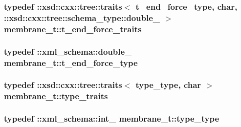 \subsubsection[{\texorpdfstring{t\+\_\+end\+\_\+force\+\_\+traits}{t_end_force_traits}}]{\setlength{\rightskip}{0pt plus 5cm}typedef \+::xsd\+::cxx\+::tree\+::traits$<$ {\bf t\+\_\+end\+\_\+force\+\_\+type}, char, \+::xsd\+::cxx\+::tree\+::schema\+\_\+type\+::double\+\_\+ $>$ {\bf membrane\+\_\+t\+::t\+\_\+end\+\_\+force\+\_\+traits}}\hypertarget{classmembrane__t_a6e52d2cbbfa0781d7ce3aec95ce1a7ab}{}\label{classmembrane__t_a6e52d2cbbfa0781d7ce3aec95ce1a7ab}
\subsubsection[{\texorpdfstring{t\+\_\+end\+\_\+force\+\_\+type}{t_end_force_type}}]{\setlength{\rightskip}{0pt plus 5cm}typedef \+::{\bf xml\+\_\+schema\+::double\+\_\+} {\bf membrane\+\_\+t\+::t\+\_\+end\+\_\+force\+\_\+type}}\hypertarget{classmembrane__t_a9c464d55e3d8162b6bb521d9dd6d761d}{}\label{classmembrane__t_a9c464d55e3d8162b6bb521d9dd6d761d}
\subsubsection[{\texorpdfstring{type\+\_\+traits}{type_traits}}]{\setlength{\rightskip}{0pt plus 5cm}typedef \+::xsd\+::cxx\+::tree\+::traits$<$ {\bf type\+\_\+type}, char $>$ {\bf membrane\+\_\+t\+::type\+\_\+traits}}\hypertarget{classmembrane__t_ac54c3884b125d2a162ce454e82f4da69}{}\label{classmembrane__t_ac54c3884b125d2a162ce454e82f4da69}
\subsubsection[{\texorpdfstring{type\+\_\+type}{type_type}}]{\setlength{\rightskip}{0pt plus 5cm}typedef \+::{\bf xml\+\_\+schema\+::int\+\_\+} {\bf membrane\+\_\+t\+::type\+\_\+type}}\hypertarget{classmembrane__t_a13eb0ee51a5a6018151503690e28e2fb}{}\label{classmembrane__t_a13eb0ee51a5a6018151503690e28e2fb}
